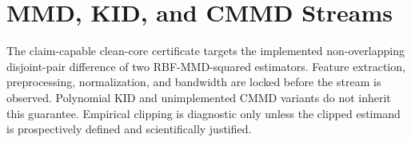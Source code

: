 \section{MMD, KID, and CMMD Streams}

The claim-capable clean-core certificate targets the implemented
non-overlapping disjoint-pair difference of two RBF-MMD-squared estimators.
Feature extraction, preprocessing, normalization, and bandwidth are locked
before the stream is observed. Polynomial KID and unimplemented CMMD variants
do not inherit this guarantee. Empirical clipping is diagnostic only unless the
clipped estimand is prospectively defined and scientifically justified.
